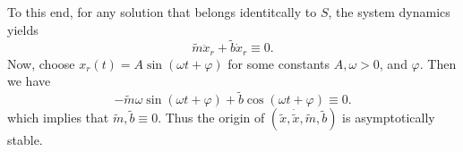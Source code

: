 To this end, for any solution that belongs identitcally to $S$, the system
dynamics yields \[ \tilde{m}\ddot{x}_r + \tilde{b}\dot{x}_r \equiv 0. \] Now,
choose $\boxed{x_r(t) = A\sin{(\omega t + \varphi)}}$ for some constants $A, \omega >
0$, and $\varphi$. Then we have 
\[ -\tilde{m}\omega\sin{\left(\omega t + \varphi\right)} +
\tilde{b}\cos{\left(\omega t + \varphi\right)} \equiv 0. \] which implies that
$\tilde{m}, \tilde{b} \equiv 0$. Thus the origin of $(\tilde{x},
\dot{\tilde{x}}, \tilde{m}, \tilde{b})$ is asymptotically stable.
